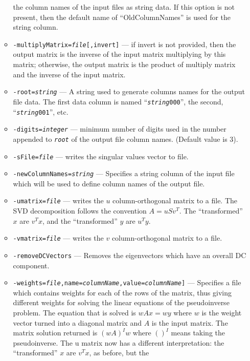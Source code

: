 \begin{itemize}
\begin{itemize}
        the column names of the input files as string data.
        If this option is not present, then the default name of ``OldColumnNames''
        is used for the string column.
    \item {\tt -multiplyMatrix={\em file}[,invert]} --- if invert is not provided,  then the output matrix is the inverse of the input
               matrix multiplying by this matrix; otherwise, the output matrix is the product of 
               multiply matrix and the inverse of the input matrix.
    \item {\tt  -root={\em string}} ---
        A string used to generate columns names for the output file data. 
        The first data column is named ``{\tt {\em string}000}'',
        the second, ``{\tt {\em string}001}'', etc.
    \item {\tt  -digits={\em integer}} --- minimum number of digits used in the number 
        appended to {\tt {\em root}} of the output file column names. (Default value is 3).
    \item {\tt -sFile={\em file}} --- writes the singular values vector to file.
    \item {\tt  -newColumnNames={\em string}} --- Specifies a string column
        of the input file which will be used to define column names
        of the output file.
    \item {\tt  -umatrix={\em file}} --- writes the $u$ column-orthogonal matrix 
       to a file. The SVD decomposition follows the convention 
       $A = u S v^T$. The ``transformed'' $x$ are $v^T x$, and 
        the ``transformed'' $y$ are $u^T y$. 
    \item {\tt  -vmatrix={\em file}} --- writes the $v$ column-orthogonal matrix to a file.
    \item {\tt  -removeDCVectors} --- Removes the eigenvectors which have an overall DC component.
    \item {\tt  -weights={\em file},name={\em columnName},value={\em columnName}]} 
        --- Specifies a file which contains weights for each of 
        the rows of the matrix, thus giving different weights for solving the 
        linear equations of the pseudoinverse problem.
        The equation that is solved is $wAx = wy$ where $w$ is the weight vector
        turned into a diagonal matrix and $A$ is the input matrix.
        The matrix solution returned is $(wA)^I w$ where $()^I$ means taking 
        the pseudoinverse. The u matrix now has a different interpretation:
        the ``transformed'' $x$ are $v^T x$, as before, but the 

\end{itemize}
\end{itemize}
